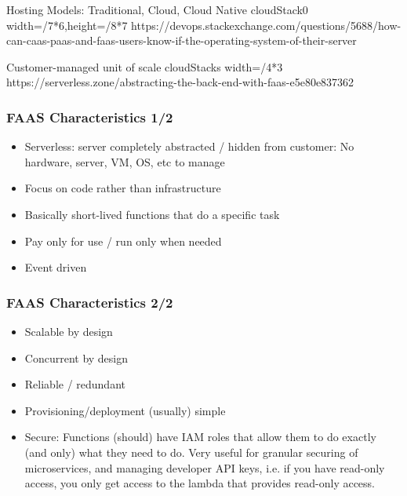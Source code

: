 \documentclass[11pt,aspectratio=169]{beamer}
\begin{document}
\nrcanGraphicFrame
  {Hosting Models: Traditional, Cloud, Cloud Native}
  {cloudStack0}
  {width=\paperwidth/7*6,height=\paperheight/8*7}
  {https://devops.stackexchange.com/questions/5688/how-can-caas-paas-and-faas-users-know-if-the-operating-system-of-their-server}

\nrcanGraphicFrame
  {Customer-managed unit of scale}
  {cloudStacks}
  {width=\paperwidth/4*3}
  {https://serverless.zone/abstracting-the-back-end-with-faas-e5e80e837362}

\begin{nrcanFrame}
  \frametitle{FAAS Characteristics 1/2}
  \begin{itemize}
  \item Serverless: server completely abstracted / hidden from
    customer: No hardware, server, VM, OS, etc to manage
  \item Focus on code rather than infrastructure
  \item Basically short-lived functions that do a specific task
  \item Pay only for use / run only when needed
  \item Event driven
  \end{itemize}
\end{nrcanFrame}


\begin{nrcanFrame}
  \frametitle{FAAS Characteristics 2/2}
  \begin{itemize}
  \item Scalable by design
  \item Concurrent by design
  \item Reliable / redundant 
  \item Provisioning/deployment (usually) simple
  \item \alert{Secure}: Functions (should) have IAM roles that 
    allow them to do exactly
    \alert{(and only)} what they need to do.
    Very useful for granular securing of microservices, and managing
    developer API keys, i.e. if you have read-only access, you only get
    access to the lambda that provides read-only access.

  \end{itemize}
\end{nrcanFrame}
\end{document}
